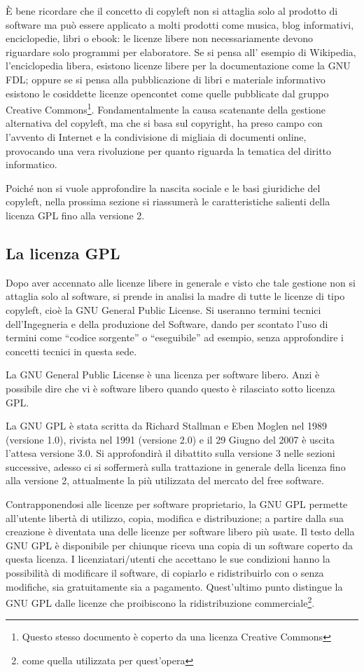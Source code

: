 \`E bene ricordare che il concetto di copyleft non si attaglia solo al prodotto di software ma può essere applicato a molti prodotti come musica, blog informativi, enciclopedie, libri o ebook: le licenze libere non necessariamente devono riguardare solo programmi per elaboratore. Se si pensa  all' esempio di Wikipedia, l'enciclopedia libera,  esistono licenze libere per la documentazione come la GNU FDL; oppure se si pensa alla pubblicazione di libri e materiale informativo esistono le cosiddette licenze opencontet come quelle pubblicate dal gruppo Creative Commons\footnote{Questo stesso documento è coperto da una licenza Creative Commons}.
Fondamentalmente la causa scatenante della gestione alternativa del copyleft, ma che si basa sul copyright, ha preso campo con l'avvento di Internet e la condivisione di migliaia di documenti online, provocando una vera rivoluzione per quanto riguarda la tematica del diritto informatico.

Poiché non si vuole approfondire la nascita sociale e le basi giuridiche del copyleft, nella prossima sezione si riassumerà le caratteristiche salienti della licenza GPL fino alla versione 2.


\subsection{La licenza GPL}

Dopo aver accennato alle licenze libere in generale e visto che tale gestione non si attaglia solo al software, si prende in analisi la madre di tutte le licenze di tipo copyleft, cioè la GNU General Public License. Si useranno termini tecnici dell'Ingegneria e della produzione del Software, dando per scontato l'uso di termini come ``codice sorgente'' o ``eseguibile'' ad esempio, senza approfondire i concetti tecnici in questa sede.

La GNU General Public License è una licenza per software libero. Anzi è possibile dire che vi è software libero quando questo è rilasciato sotto licenza GPL.

La GNU GPL è stata scritta da Richard Stallman e Eben Moglen nel 1989 (versione 1.0), rivista nel 1991 (versione 2.0) e il 29 Giugno del 2007 è uscita l'attesa versione 3.0. Si approfondirà il dibattito sulla versione 3 nelle sezioni successive, adesso ci si soffermerà sulla trattazione in generale della licenza fino alla versione 2, attualmente la più utilizzata del mercato del free software.

Contrapponendosi alle licenze per software proprietario, la GNU GPL permette all'utente libertà di utilizzo, copia, modifica e distribuzione; a partire dalla sua creazione è diventata una delle licenze per software libero più usate. Il testo della GNU GPL è disponibile per chiunque riceva una copia di un software coperto da questa licenza. I licenziatari/utenti che accettano le sue condizioni hanno la possibilità di modificare il software, di copiarlo e ridistribuirlo con o senza modifiche, sia gratuitamente sia a pagamento. Quest'ultimo punto distingue la GNU GPL dalle licenze che proibiscono la ridistribuzione commerciale\footnote{come quella utilizzata per quest'opera}.

